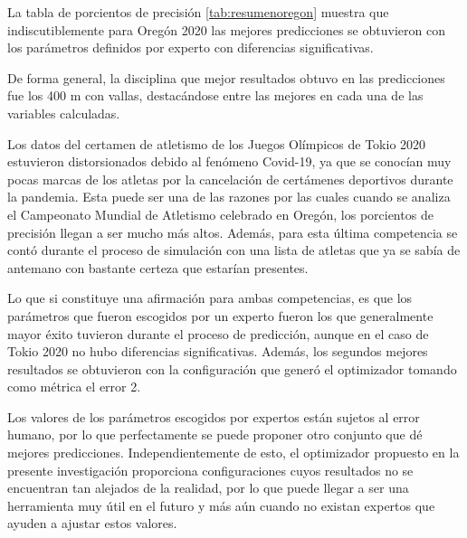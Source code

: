 La tabla de porcientos de precisión \ref{tab:resumenoregon} muestra que indiscutiblemente para Oregón 2020 las mejores predicciones se obtuvieron con los parámetros definidos por experto con diferencias significativas.

De forma general, la disciplina que mejor resultados obtuvo en las predicciones fue los 400 m con vallas, destacándose entre las mejores en cada una de las variables calculadas.

Los datos del certamen de atletismo de los Juegos Olímpicos de Tokio 2020 estuvieron distorsionados debido al fenómeno Covid-19, ya que se conocían muy pocas marcas de los atletas por la cancelación de certámenes deportivos durante la pandemia. Esta puede ser una de las razones por las cuales cuando se analiza el Campeonato Mundial de Atletismo celebrado en Oregón, los porcientos de precisión llegan a ser mucho más altos. Además, para esta última competencia se contó durante el proceso de simulación con una lista de atletas que ya se sabía de antemano con bastante certeza que estarían presentes.

Lo que si constituye una afirmación para ambas competencias, es que los parámetros que fueron escogidos por un experto fueron los que generalmente mayor éxito tuvieron durante el proceso de predicción, aunque en el caso de Tokio 2020 no hubo diferencias significativas. Además, los segundos mejores resultados se obtuvieron con la configuración que generó el optimizador tomando como métrica el error 2.

Los valores de los parámetros escogidos por expertos están sujetos al error humano, por lo que perfectamente se puede proponer otro conjunto que dé mejores predicciones. Independientemente de esto, el optimizador propuesto en la presente investigación proporciona configuraciones cuyos resultados no se encuentran tan alejados de la realidad, por lo que puede llegar a ser una herramienta muy útil en el futuro y más aún cuando no existan expertos que ayuden a ajustar estos valores.